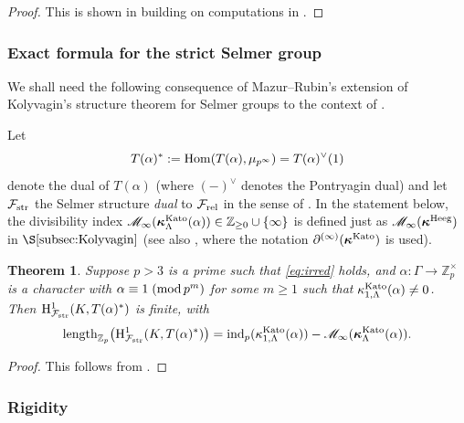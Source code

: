 \documentclass[10pt,reqno]{amsart}
\numberwithin{equation}{section}
\theoremstyle{plain}
\newtheorem{thm}{Theorem}[subsection] %
\theoremstyle{definition}
\theoremstyle{definition}
\theoremstyle{plain}
\theoremstyle{plain}
\theoremstyle{plain}
\theoremstyle{plain}
\theoremstyle{plain}
\theoremstyle{plain}
\newcommand{\Z}{\mathbb{Z}}
\newcommand{\Fcal}{\mathcal{F}}
\newcommand{\rH}{\mathrm{H}}
\begin{document}
\begin{proof}
This is shown in \cite[Thm.~3.11]{kim} building on computations in \cite[\S\S{6-7}]{KKS}.
\end{proof}



\subsubsection{Exact formula for the strict Selmer group}

We shall need the following consequence of Mazur--Rubin's extension of Kolyvagin's structure theorem for Selmer groups \cite{kolystructure} to the context of \cite{mazrub}. 

Let 
$$T(\alpha)^*:={\rm Hom}(T(\alpha),\mu_{p^\infty})=T(\alpha)^\vee(1)$$
denote the dual of $T(\alpha)$ (where $(-)^\vee$ denotes the Pontryagin dual) and let $\Fcal_{\rm str}$ the Selmer structure \emph{dual} to $\Fcal_{\rm rel}$ in the sense of \cite[\S{2.3}]{mazrub}. In the statement below, the divisibility index $\mathscr{M}_\infty(\boldsymbol{\kappa}_\Lambda^{\rm Kato}(\alpha))\in\Z_{\geq 0}\cup\{\infty\}$ is defined just as $\mathscr{M}_\infty(\boldsymbol{\kappa}^{\rm Heeg})$ in $\S\ref{subsec:Kolyvagin}$ (see also \cite[Def.~5.2.11]{mazrub}, where the notation $\partial^{(\infty)}(\boldsymbol{\kappa}^{\rm Kato})$ is used).

\begin{thm}\label{thm:str-Kato}
Suppose $p>3$ is a prime such that \eqref{eq:irred} holds,  and $\alpha:\Gamma\rightarrow\Z_p^\times$ is a character with $\alpha\equiv 1\;({\rm mod}\,p^m)$ for some $m\geq 1$ such that $\kappa_{1,\Lambda}^{\rm Kato}(\alpha)\neq 0$. Then $\rH^1_{\Fcal_{\rm str}}(K,T(\alpha)^*)$ is finite, with 
\[
{\rm length}_{\Z_p}\bigl(\rH^1_{\Fcal_{\rm str}}(K,T(\alpha)^*)\bigr)=
{\rm ind}_p(\kappa_{1,\Lambda}^{\rm Kato}(\alpha))-\mathscr{M}_\infty(\boldsymbol{\kappa}_\Lambda^{\rm Kato}(\alpha)).
\]
\end{thm}

\begin{proof}
This follows from \cite[Thm.~5.2.12]{mazrub}.
\end{proof}

\subsubsection{Rigidity}
\end{document}
